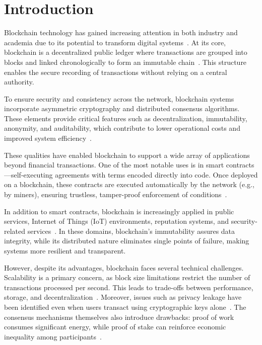 \chapter{Introduction}
Blockchain technology has gained increasing attention in both industry and academia due to its potential to transform digital systems~\cite{state2016blockchain}. At its core, blockchain is a decentralized public ledger where transactions are grouped into blocks and linked chronologically to form an immutable chain~\cite{nakamoto2008bitcoin}. This structure enables the secure recording of transactions without relying on a central authority.

To ensure security and consistency across the network, blockchain systems incorporate asymmetric cryptography and distributed consensus algorithms. These elements provide critical features such as decentralization, immutability, anonymity, and auditability, which contribute to lower operational costs and improved system efficiency~\cite{nakamoto2008bitcoin}.

These qualities have enabled blockchain to support a wide array of applications beyond financial transactions. One of the most notable uses is in smart contracts—self-executing agreements with terms encoded directly into code. Once deployed on a blockchain, these contracts are executed automatically by the network (e.g., by miners), ensuring trustless, tamper-proof enforcement of conditions~\cite{kosba2016hawk}.

In addition to smart contracts, blockchain is increasingly applied in public services, Internet of Things (IoT) environments\cite{zhang2015iot}, reputation systems\cite{sharples2015blockchain}, and security-related services~\cite{hyperledger2015}. In these domains, blockchain’s immutability assures data integrity, while its distributed nature eliminates single points of failure, making systems more resilient and transparent.

However, despite its advantages, blockchain faces several technical challenges. Scalability is a primary concern, as block size limitations restrict the number of transactions processed per second. This leads to trade-offs between performance, storage, and decentralization~\cite{nakamoto2008bitcoin}. Moreover, issues such as privacy leakage have been identified even when users transact using cryptographic keys alone~\cite{biryukov2014deanonymisation}. The consensus mechanisms themselves also introduce drawbacks: proof of work consumes significant energy, while proof of stake can reinforce economic inequality among participants~\cite{biryukov2014deanonymisation}.

